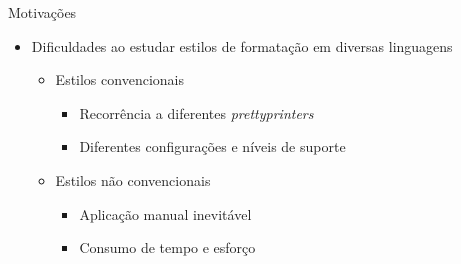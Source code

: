 \documentclass
  [ aspectratio=169,
    english,
    hyperref={citecolor=blue,colorlinks=true,linkcolor=blue,urlcolor=blue},
    brazil]
  {beamer}
\title{\worktitle}
\subtitle{\worksubtitle}
\author{Átila Gama Silva}
\date{\today}
\begin{document}


  \newlength{\halfpart}
  \setlength{\halfpart}{.5\textwidth - .5em}


  \newlength{\halftextwidthplustwoempart}
  \setlength{\halftextwidthplustwoempart}{.5\textwidth + 2em}
  \newlength{\halftextwidthplustwoemcounterpart}
  \setlength{\halftextwidthplustwoemcounterpart}{.5\textwidth - 3em}


  \newlength{\halftextwidthplusfiveempart}
  \setlength{\halftextwidthplusfiveempart}{.5\textwidth + 5em}
  \newlength{\halftextwidthplusfiveemcounterpart}
  \setlength{\halftextwidthplusfiveemcounterpart}{.5\textwidth - 6em}


  \begin{frame}\titlepage\end{frame}


  \begin{frame}{Motivações}
    \begin{itemize}
      \item Dificuldades ao estudar estilos de formatação em diversas
            linguagens
            \begin{itemize}
              \item Estilos convencionais
                    \begin{itemize}
                      \item Recorrência a diferentes \textit{prettyprinters}
                      \item Diferentes configurações e níveis de suporte
                    \end{itemize}
              \item Estilos não convencionais
                    \begin{itemize}
                      \item Aplicação manual inevitável
                      \item Consumo de tempo e esforço
                    \end{itemize}
            \end{itemize}
    \end{itemize}
  \end{frame}
\end{document}
